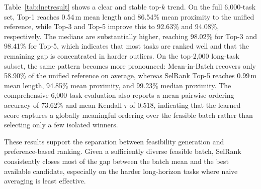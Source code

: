 \documentclass[journal, twoside]{IEEEtran}
\begin{document}
Table~\ref{tab:lnetresult} shows a clear and stable top-$k$ trend. On the full 6{,}000-task set, Top-1 reaches 0.54\,m mean length and 86.54\% mean proximity to the unified reference, while Top-3 and Top-5 improve this to 92.63\% and 94.08\%, respectively. The medians are substantially higher, reaching 98.02\% for Top-3 and 98.41\% for Top-5, which indicates that most tasks are ranked well and that the remaining gap is concentrated in harder outliers. On the top-2{,}000 long-task subset, the same pattern becomes more pronounced: Mean-in-Batch recovers only 58.90\% of the unified reference on average, whereas SelRank Top-5 reaches 0.99\,m mean length, 94.85\% mean proximity, and 99.23\% median proximity. The comprehensive 6{,}000-task evaluation also reports a mean pairwise ordering accuracy of 73.62\% and mean Kendall $\tau$ of 0.518, indicating that the learned score captures a globally meaningful ordering over the feasible batch rather than selecting only a few isolated winners.

These results support the separation between feasibility generation and preference-based ranking. Given a sufficiently diverse feasible batch, SelRank consistently closes most of the gap between the batch mean and the best available candidate, especially on the harder long-horizon tasks where naive averaging is least effective.
\end{document}

